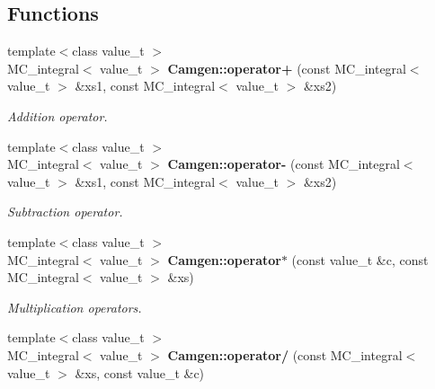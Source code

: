 \subsection*{Functions}
\begin{DoxyCompactItemize}
\item 
\hypertarget{a00878_ab1a6213080c5b6957b5e020bca5c4834}{}{\footnotesize template$<$class value\+\_\+t $>$ }\\M\+C\+\_\+integral$<$ value\+\_\+t $>$ {\bfseries Camgen\+::operator+} (const M\+C\+\_\+integral$<$ value\+\_\+t $>$ \&xs1, const M\+C\+\_\+integral$<$ value\+\_\+t $>$ \&xs2)\label{a00878_ab1a6213080c5b6957b5e020bca5c4834}

\begin{DoxyCompactList}\small\item\em Addition operator. \end{DoxyCompactList}\item 
\hypertarget{a00878_ac4b8d41e45449acee2e0ca88ebd57e7d}{}{\footnotesize template$<$class value\+\_\+t $>$ }\\M\+C\+\_\+integral$<$ value\+\_\+t $>$ {\bfseries Camgen\+::operator-\/} (const M\+C\+\_\+integral$<$ value\+\_\+t $>$ \&xs1, const M\+C\+\_\+integral$<$ value\+\_\+t $>$ \&xs2)\label{a00878_ac4b8d41e45449acee2e0ca88ebd57e7d}

\begin{DoxyCompactList}\small\item\em Subtraction operator. \end{DoxyCompactList}\item 
\hypertarget{a00878_ad0e755d4416b6c2f36d4b5a8466c33bb}{}{\footnotesize template$<$class value\+\_\+t $>$ }\\M\+C\+\_\+integral$<$ value\+\_\+t $>$ {\bfseries Camgen\+::operator$\ast$} (const value\+\_\+t \&c, const M\+C\+\_\+integral$<$ value\+\_\+t $>$ \&xs)\label{a00878_ad0e755d4416b6c2f36d4b5a8466c33bb}

\begin{DoxyCompactList}\small\item\em Multiplication operators. \end{DoxyCompactList}\item 
\hypertarget{a00878_ae7c359b169e13bc5a2b6aa39e48a9d35}{}{\footnotesize template$<$class value\+\_\+t $>$ }\\M\+C\+\_\+integral$<$ value\+\_\+t $>$ {\bfseries Camgen\+::operator/} (const M\+C\+\_\+integral$<$ value\+\_\+t $>$ \&xs, const value\+\_\+t \&c)\label{a00878_ae7c359b169e13bc5a2b6aa39e48a9d35}


\end{DoxyCompactItemize}
